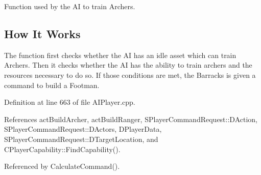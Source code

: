 Function used by the AI to train Archers. 

\hypertarget{classCAIPlayer_tfhow_sec}{}\subsection{How It Works}\label{classCAIPlayer_tfhow_sec}
The function first checks whether the AI has an idle asset which can train Archers. Then it checks whether the AI has the ability to train archers and the resources necessary to do so. If those conditions are met, the Barracks is given a command to build a Footman. 

Definition at line 663 of file A\+I\+Player.\+cpp.



References act\+Build\+Archer, act\+Build\+Ranger, S\+Player\+Command\+Request\+::\+D\+Action, S\+Player\+Command\+Request\+::\+D\+Actors, D\+Player\+Data, S\+Player\+Command\+Request\+::\+D\+Target\+Location, and C\+Player\+Capability\+::\+Find\+Capability().



Referenced by Calculate\+Command().


